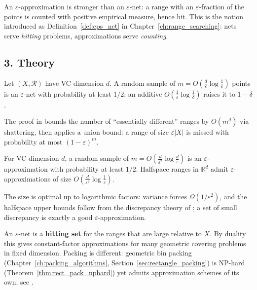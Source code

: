 An $\varepsilon$-approximation is stronger than an $\varepsilon$-net: a
range with an $\varepsilon$-fraction of the points is counted with
positive empirical measure, hence hit. This is the notion introduced as
Definition~\ref{def:eps_net} in Chapter~\ref{ch:range_searching}: nets serve
\emph{hitting} problems, approximations serve \emph{counting}.

\subsection{3. Theory}

\begin{theorem}\label{thm:approx_eps_net_bound}
  Let $(X, \mathcal{R})$ have VC dimension $d$. A random sample of
  $m = O(\frac{d}{\varepsilon}\log\frac{1}{\varepsilon})$ points is an
  $\varepsilon$-net with probability at least $1/2$; an additive
  $O(\frac{1}{\varepsilon}\log\frac{1}{\delta})$ raises it to $1 - \delta$.
\end{theorem}

The proof in \cite{hausslerwelzl1987} bounds the number of ``essentially
different'' ranges by $O(m^d)$ via shattering, then applies a union bound:
a range of size $\varepsilon |X|$ is missed with probability at most
$(1 - \varepsilon)^m$.

\begin{theorem}\label{thm:approx_eps_approx_bound}
  For VC dimension $d$, a random sample of
  $m = O(\frac{d}{\varepsilon^2}\log\frac{d}{\varepsilon})$ is an
  $\varepsilon$-approximation with probability at least $1/2$. Halfspace
  ranges in $\mathbb{R}^d$ admit $\varepsilon$-approximations of size
  $O(\frac{d}{\varepsilon^2}\log\frac{1}{\varepsilon})$.
\end{theorem}

The size is optimal up to logarithmic factors: variance forces
$\Omega(1/\varepsilon^2)$, and the halfspace upper bounds follow from the
discrepancy theory of \cite{matousek1995,matousek1999}; a set of small
discrepancy is exactly a good $\varepsilon$-approximation.

\begin{remark}\label{rem:approx_hitting}
  An $\varepsilon$-net is a \textbf{hitting set} for the ranges that are
  large relative to $X$. By duality this gives constant-factor
  approximations for many geometric covering problems in fixed dimension.
  Packing is different: geometric bin packing (Chapter~\ref{ch:packing_algorithms},
  Section~\ref{sec:rectangle_packing}) is NP-hard
  (Theorem~\ref{thm:rect_pack_nphard}) yet admits approximation schemes of
  its own; see \cite{deberg2008,harpeled2011}.
\end{remark}

